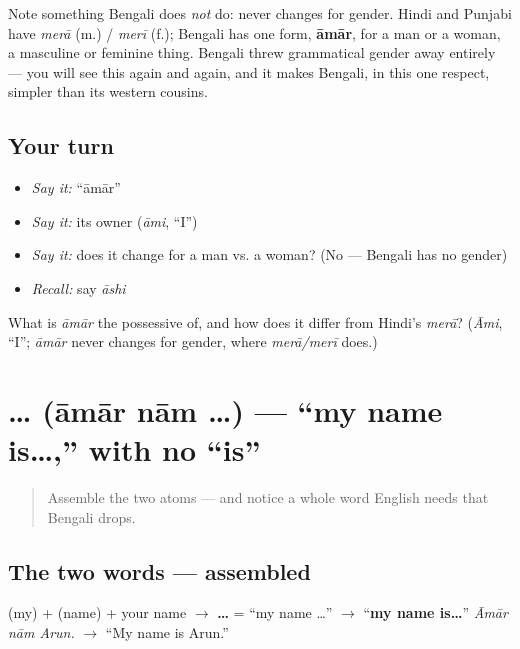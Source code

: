 \begin{grammarlens}[title={Grammar Lens: no gender here}]
Note something Bengali does \emph{not} do: \textbf{} never changes for gender. Hindi and Punjabi have \emph{merā} (m.) / \emph{merī} (f.); Bengali has one form, \textbf{āmār}, for a man or a woman, a masculine or feminine thing. Bengali threw grammatical gender away entirely — you will see this again and again, and it makes Bengali, in this one respect, simpler than its western cousins.
\end{grammarlens}

\subsection*{Your turn}
\begin{itemize}
\raggedright
  \item \emph{Say it:} \textquotedblleft{}āmār\textquotedblright{}
  \item \emph{Say it:} its owner (\emph{āmi}, \textquotedblleft{}I\textquotedblright{})
  \item \emph{Say it:} does it change for a man vs. a woman? (No — Bengali has no gender)
  \item \emph{Recall:} say \emph{āshi}
\end{itemize}

\begin{tcolorbox}[breakable,colback=teal!4,colframe=teal!35!black,title={Before you move on}]
What is \emph{āmār} the possessive of, and how does it differ from Hindi's \emph{merā}? (\emph{Āmi}, \textquotedblleft{}I\textquotedblright{}; \emph{āmār} never changes for gender, where \emph{merā/merī} does.)
\end{tcolorbox}
\section[\texorpdfstring{\bn{আমার} \bn{নাম} … (āmār nām …)}{আমার নাম … (āmār nām …)}]{  … (āmār nām …) — \textquotedblleft{}my name is…,\textquotedblright{} with no \textquotedblleft{}is\textquotedblright{}}

\label{lesson:BN-C02-amar-naam}



\begin{quote}
Assemble the two atoms — and notice a whole word English needs that Bengali drops.
\end{quote}

\subsection*{The two words — assembled}
\textbf{} (my) + \textbf{} (name) + your name $\to$ \textbf{  …} = \textquotedblleft{}my name …\textquotedblright{} $\to$ \textquotedblleft{}\textbf{my name is…}\textquotedblright{} \emph{Āmār nām Arun.} $\to$ \textquotedblleft{}My name is Arun.\textquotedblright{}

